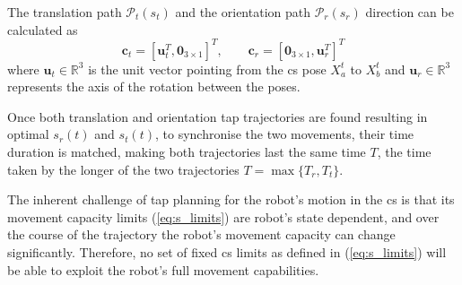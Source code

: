 

The translation path $\mathscr{P}_t(s_t)$ and the orientation path $\mathscr{P}_r(s_r)$ direction can be calculated as 
\begin{equation}
    \bm{c}_t = [\bm{u}_t^T, \bm{0}_{3\times 1}]^T, \qquad \bm{c}_r =[\bm{0}_{3\times 1}, \bm{u}_r^T]^T
    \label{eq:directions_path}
\end{equation}
where $\bm{u}_t\in\mathbb{R}^3$ is the unit vector pointing from the \gls{cs} pose $X_a^t$ to $X_b^t$ and $\bm{u}_r\in\mathbb{R}^3$ represents the axis of the rotation between the poses.

Once both translation and orientation \gls{tap} trajectories are found resulting in optimal $s_r(t)$ and $s_t(t)$, to synchronise the two movements, their time duration is matched, making both trajectories last the same time $T$, the time taken by the longer of the two trajectories $T = \max\{T_r,T_t\}$. 

The inherent challenge of \gls{tap} planning for the robot's motion in the \gls{cs} is that its movement capacity limits (\ref{eq:s_limits}) are robot's state dependent, and over the course of the trajectory the robot's movement capacity can change significantly. Therefore, no set of fixed \gls{cs} limits as defined in (\ref{eq:s_limits}) will be able to exploit the robot's full movement capabilities.  

